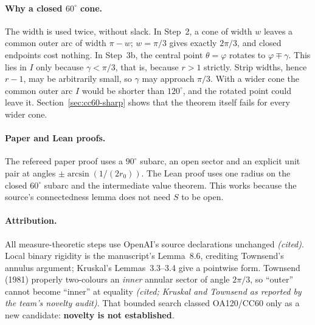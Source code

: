 \documentclass[11pt]{article}
\theoremstyle{definition}
\theoremstyle{remark}
\begin{document}
\paragraph{Why a closed $60^\circ$ cone.} The width is used twice, without
slack. In Step~2, a cone of width $w$ leaves a common outer arc of width
$\pi-w$; $w=\pi/3$ gives exactly $2\pi/3$, and closed endpoints cost
nothing. In Step~3b, the central point $\theta=\varphi$ rotates to
$\varphi\mp\gamma$. This lies in $I$ only because $\gamma<\pi/3$, that is,
because $r>1$ strictly. Strip widths, hence $r-1$, may be arbitrarily small,
so $\gamma$ may approach $\pi/3$. With a wider cone the common outer arc $I$ would be shorter than $120^\circ$, and the rotated point could leave it.
Section~\ref{sec:cc60-sharp} shows that the theorem itself fails for every
wider cone.

\paragraph{Paper and Lean proofs.} The refereed paper proof uses a
$90^\circ$ subarc, an open sector and an explicit unit pair at angles
$\pm\arcsin(1/(2r_0))$. The Lean proof uses one radius on the closed
$60^\circ$ subarc and the intermediate value theorem. This works because the
source's connectedness lemma does not need $S$ to be open.

\paragraph{Attribution.} All measure-theoretic steps use OpenAI's source
declarations unchanged \emph{(cited)}. Local binary rigidity is the
manuscript's Lemma~8.6, crediting Townsend's annulus argument; Kruskal's
Lemmas~3.3--3.4 give a pointwise form. Townsend (1981) properly two-colours
an \emph{inner} annular sector of angle $2\pi/3$, so ``outer'' cannot
become ``inner'' at equality \emph{(cited; Kruskal and Townsend as reported
by the team's novelty audit)}. That bounded search classed OA120/CC60 only
as a new candidate: \textbf{novelty is not established}.
\end{document}

